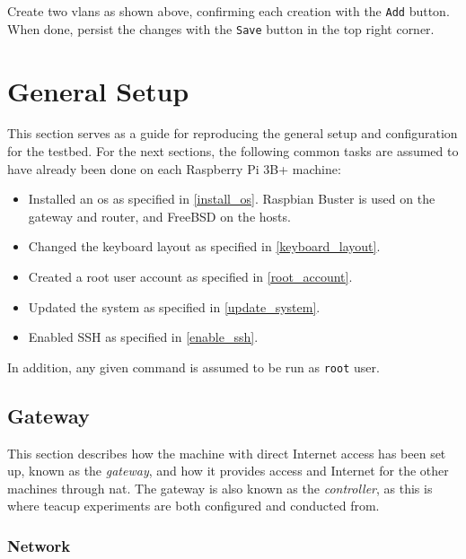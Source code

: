 Create two \gls{vlan}s as shown above, confirming each creation with the \lstinline{Add} button. When done, persist the changes with the \lstinline{Save} button in the top right corner.









\section{General Setup}

This section serves as a guide for reproducing the general setup and configuration for the testbed. For the next sections, the following common tasks are assumed to have already been done on each Raspberry Pi 3B+ machine:

\begin{itemize}
    \item Installed an \gls{os} as specified in \ref{install_os}. Raspbian Buster is used on the gateway and router, and FreeBSD on the hosts.
    \item Changed the keyboard layout as specified in \ref{keyboard_layout}.
    \item Created a root user account as specified in \ref{root_account}.
    \item Updated the system as specified in \ref{update_system}.
    \item Enabled SSH as specified in \ref{enable_ssh}.
\end{itemize}

In addition, any given command is assumed to be run as \lstinline{root} user.




\subsection{Gateway}

This section describes how the machine with direct Internet access has been set up, known as the \textit{gateway}, and how it provides access and Internet for the other machines through \gls{nat}. The gateway is also known as the \textit{controller}, as this is where \gls{teacup} experiments are both configured and conducted from.


\subsubsection{Network}

